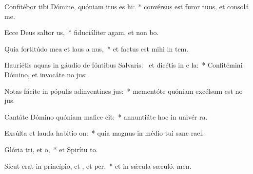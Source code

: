 \item Confitébor tibi Dómine, quóniam itus es hi:~* convérsus est furor tuus, et consolá  me.
\item Ecce Deus saltor us,~* fiduciáliter agam, et non bo.
\item Quia fortitúdo mea et laus a nus,~* et factus est mihi in tem.
\item Hauriétis aquas in gáudio de fóntibus Salvaris:~\pscross{} et dicétis in e la:~* Confitémini Dómino, et invocáte no jus:
\item Notas fácite in pópulis adinventines jus:~* mementóte quóniam excélsum est no jus.
\item Cantáte Dómino quóniam mafice cit:~* annuntiáte hoc in univér ra.
\item Exsúlta et lauda habitio on:~* quia magnus in médio tui sanc rael.
\item Glória tri, et o,~* et Spirítu to.
\item Sicut erat in princípio, et , et per,~* et in sǽcula sæculó. men.
